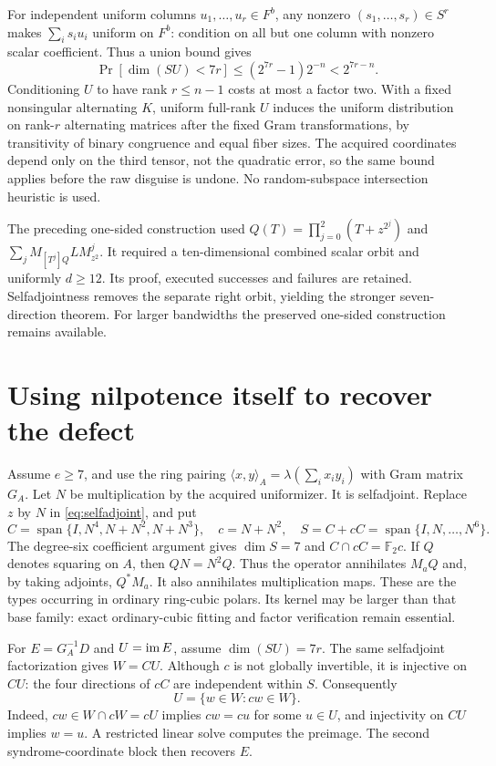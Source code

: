 \documentclass[11pt]{article}
\theoremstyle{remark}\newtheorem{remark}[theorem]{Remark}
\newcommand{\F}{\mathbb F}\newcommand{\Tr}{\operatorname{Tr}}
\newcommand{\Span}{\operatorname{span}}\newcommand{\GL}{\operatorname{GL}}
\begin{document}
For independent uniform columns $u_1,\ldots,u_r\in F^b$, any nonzero
$(s_1,\ldots,s_r)\in S^r$ makes $\sum_i s_i u_i$ uniform on $F^b$:
condition on all but one column with nonzero scalar coefficient.
Thus a union bound gives
\[
 \Pr[\dim(SU)<7r]\le(2^{7r}-1)2^{-n}<2^{7r-n}.
\]
Conditioning $U$ to have rank $r\le n-1$ costs at most a factor two.
With a fixed nonsingular alternating $K$, uniform full-rank $U$ induces
the uniform distribution on rank-$r$ alternating matrices after the fixed
Gram transformations, by transitivity of binary congruence and equal fiber
sizes. The acquired coordinates depend only on the third tensor, not the
quadratic error, so the same bound applies before the raw disguise is undone.
No random-subspace intersection heuristic is used.

The preceding one-sided construction used
$Q(T)=\prod_{j=0}^2(T+z^{2^j})$ and
$\sum_jM_{[T^j]Q}LM_{z^2}^j$. It required a ten-dimensional combined scalar
orbit and uniformly $d\ge12$. Its proof, executed successes and failures
are retained. Selfadjointness removes the separate right orbit, yielding
the stronger seven-direction theorem. For larger bandwidths the preserved
one-sided construction remains available.

\section{Using nilpotence itself to recover the defect}
Assume $e\ge7$, and use the ring pairing
$\langle x,y\rangle_A=\lambda(\sum_i x_i y_i)$ with Gram matrix $G_A$.
Let $N$ be multiplication by the acquired uniformizer. It is selfadjoint.
Replace $z$ by $N$ in \eqref{eq:selfadjoint}, and put
\[
 C=\Span\{I,N^4,N+N^2,N+N^3\},\quad c=N+N^2,\quad
 S=C+cC=\Span\{I,N,\ldots,N^6\}.
\]
The degree-six coefficient argument gives $\dim S=7$ and
$C\cap cC=\F_2c$.
If $Q$ denotes squaring on $A$, then $QN=N^2Q$.
Thus the operator annihilates $M_aQ$ and, by taking adjoints, $Q^*M_a$.
It also annihilates multiplication maps. These are the types occurring
in ordinary ring-cubic polars. Its kernel may be larger than that base
family: exact ordinary-cubic fitting and factor verification remain essential.

For $E=G_A^{-1}D$ and $U=\operatorname{im} E$, assume $\dim(SU)=7r$.
The same selfadjoint factorization gives $W=CU$.
Although $c$ is not globally invertible, it is injective on $CU$:
the four directions of $cC$ are independent within $S$.
Consequently
\[
 U=\{w\in W:cw\in W\}.
\]
Indeed, $cw\in W\cap cW=cU$ implies $cw=cu$ for some $u\in U$,
and injectivity on $CU$ implies $w=u$. A restricted linear solve
computes the preimage. The second syndrome-coordinate block then recovers $E$.
\end{document}
